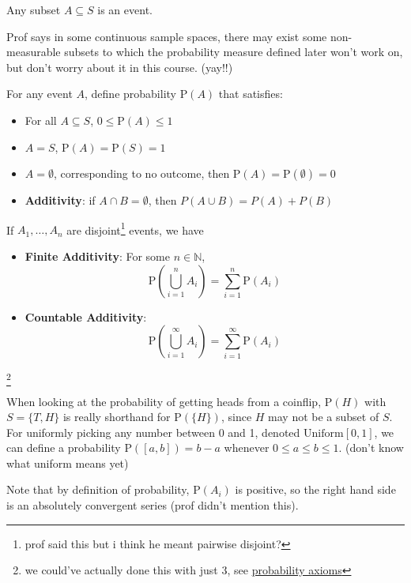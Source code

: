 \begin{definition}[Event]
Any subset $A \subseteq S$ is an event. 
\end{definition}
Prof says in some continuous sample spaces, there may exist some non-measurable subsets to which the probability measure defined later won't work on, but don't worry about it in this course. (yay!!)
\begin{definition}[Probability]
    For any event $A$, define probability $\mathrm{P}(A)$ that satisfies:
    \begin{itemize}
        \item For all $A \subseteq S$, $0 \leq \mathrm{P}(A) \leq 1$
        \item $A = S$, $\mathrm{P}(A) = \mathrm{P}(S) = 1$
        \item $A = \emptyset$, corresponding to no outcome, then $\mathrm{P}(A) = \mathrm{P}(\emptyset) = 0$
        \item \textbf{Additivity}: if $A \cap B = \emptyset$, then $P(A \cup B) = P(A) + P(B)$ \label{prop:probadd} 
    \end{itemize}
    If $A_1, \dots, A_n$ are disjoint\footnote{prof said this but i think he meant pairwise disjoint?} events, we have
    \begin{itemize}
        \item \textbf{Finite Additivity}: For some $n \in \mathbb{N}$,
\[
\mathrm{P}\left(\bigcup_{i = 1}^n A_i\right) = \sum_{i=1}^n \mathrm{P}(A_i)
\]
        \item \textbf{Countable Additivity}:
\[
\mathrm{P}\left(\bigcup_{i=1}^\infty A_i\right) = \sum_{i=1}^\infty \mathrm{P}(A_i)
\]
    \end{itemize}

\end{definition}\footnote{we could've actually done this with just 3, see \href{https://en.wikipedia.org/wiki/Probability_axioms}{probability axioms}}

When looking at the probability of getting heads from a coinflip, $\mathrm{P}(H)$ with $S = \{T, H\}$ is really shorthand for $\mathrm{P}(\{ H \})$, since $H$ may not be a subset of $S$. For uniformly picking any number between 0 and 1, denoted $\mathrm{Uniform}[0, 1]$, we can define a probability $\mathrm{P}([a, b]) = b - a$ whenever $0 \leq a \leq b \leq 1$. (don't know what uniform means yet)

Note that by definition of probability, $\mathrm{P}(A_i)$ is positive, so the right hand side is an absolutely convergent series (prof didn't mention this).
